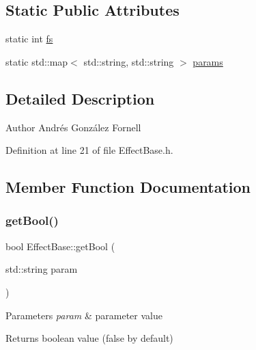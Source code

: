 \subsection*{Static Public Attributes}
\begin{DoxyCompactItemize}
\item 
static int \hyperlink{class_effect_base_a18021994da076630edfe26d69fd1384f}{fs}
\item 
static std\+::map$<$ std\+::string, std\+::string $>$ \hyperlink{class_effect_base_a593c207eb855ae1bc37069766da29c9a}{params}
\end{DoxyCompactItemize}


\subsection{Detailed Description}
\begin{DoxyAuthor}{Author}
Andrés González Fornell 
\end{DoxyAuthor}


Definition at line 21 of file Effect\+Base.\+h.



\subsection{Member Function Documentation}
\mbox{\label{class_effect_base_a5ce32d92ebf6973d177d0f8d1be8e8ba}} 
\subsubsection{\texorpdfstring{get\+Bool()}{getBool()}}
{\footnotesize\ttfamily bool Effect\+Base\+::get\+Bool (\begin{DoxyParamCaption}\item[{std\+::string}]{param }\end{DoxyParamCaption})\hspace{0.3cm}{\ttfamily [static]}}


\begin{DoxyParams}{Parameters}
{\em param} & parameter value \\
\hline
\end{DoxyParams}
\begin{DoxyReturn}{Returns}
boolean value (false by default) 
\end{DoxyReturn}


